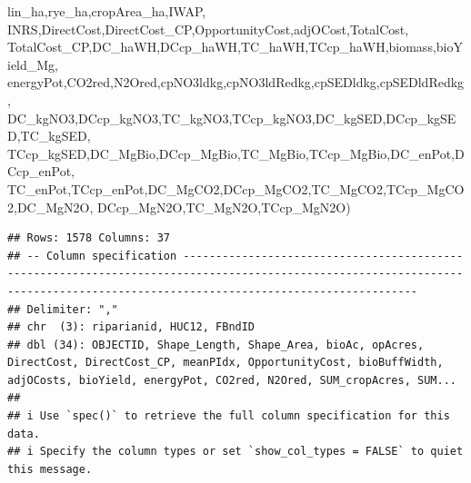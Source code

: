 \documentclass[
]{article}
\newenvironment{Shaded}{\begin{snugshade}}{\end{snugshade}}
\newcommand{\NormalTok}[1]{#1}
\begin{document}
\begin{Shaded}
\begin{Highlighting}[]
\NormalTok{         lin\_ha,rye\_ha,cropArea\_ha,IWAP,}
\NormalTok{         INRS,DirectCost,DirectCost\_CP,OpportunityCost,adjOCost,TotalCost,}
\NormalTok{         TotalCost\_CP,DC\_haWH,DCcp\_haWH,TC\_haWH,TCcp\_haWH,biomass,bioYield\_Mg,}
\NormalTok{         energyPot,CO2red,N2Ored,cpNO3ldkg,cpNO3ldRedkg,cpSEDldkg,cpSEDldRedkg,}
\NormalTok{         DC\_kgNO3,DCcp\_kgNO3,TC\_kgNO3,TCcp\_kgNO3,DC\_kgSED,DCcp\_kgSED,TC\_kgSED,}
\NormalTok{         TCcp\_kgSED,DC\_MgBio,DCcp\_MgBio,TC\_MgBio,TCcp\_MgBio,DC\_enPot,DCcp\_enPot,}
\NormalTok{         TC\_enPot,TCcp\_enPot,DC\_MgCO2,DCcp\_MgCO2,TC\_MgCO2,TCcp\_MgCO2,DC\_MgN2O,}
\NormalTok{         DCcp\_MgN2O,TC\_MgN2O,TCcp\_MgN2O)}
\end{Highlighting}
\end{Shaded}

\begin{verbatim}
## Rows: 1578 Columns: 37
## -- Column specification --------------------------------------------------------------------------------------------------------------------------------------------------------------------------------
## Delimiter: ","
## chr  (3): riparianid, HUC12, FBndID
## dbl (34): OBJECTID, Shape_Length, Shape_Area, bioAc, opAcres, DirectCost, DirectCost_CP, meanPIdx, OpportunityCost, bioBuffWidth, adjOCosts, bioYield, energyPot, CO2red, N2Ored, SUM_cropAcres, SUM...
## 
## i Use `spec()` to retrieve the full column specification for this data.
## i Specify the column types or set `show_col_types = FALSE` to quiet this message.
\end{verbatim}
\end{document}

